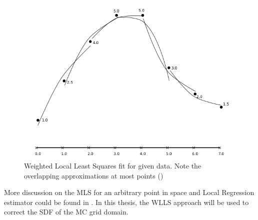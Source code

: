 \begin{figure}[H]
	\begin{center}
		\includegraphics[width=\textwidth]{figures/WLLS.png}
	\end{center}
	\caption{Weighted Local Least Squares fit for given data. Note the overlapping approximations at most points (\cite{MLSIntro})}
	\label{fig:WLLS}
\end{figure}

More discussion on the MLS for an arbitrary point in space and Local Regression estimator could be found in \cite{MLSIntro}. In this thesis, the WLLS approach will be used to correct the SDF of the MC grid domain.

